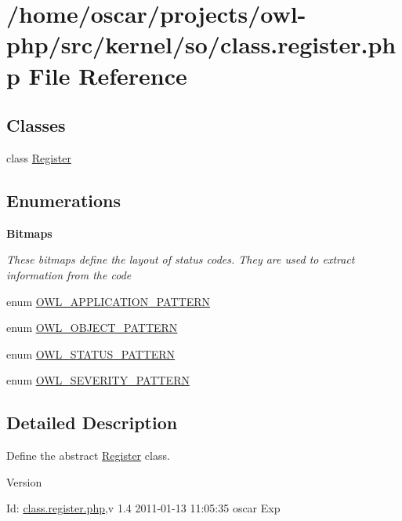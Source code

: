 \section{/home/oscar/projects/owl-\/php/src/kernel/so/class.register.php File Reference}
\label{class_8register_8php}
\subsection*{Classes}
\begin{DoxyCompactItemize}
\item 
class \hyperlink{classRegister}{Register}
\end{DoxyCompactItemize}
\subsection*{Enumerations}
\begin{Indent}{\bf Bitmaps}\par
{\em \label{_amgrp2ec9eef022a1b519bdb1040e05224b00}
 These bitmaps define the layout of status codes. They are used to extract information from the code }\begin{DoxyCompactItemize}
\item 
enum \hyperlink{class_8register_8php_a22359c406b8745e8fa2412ec96d5e74c}{OWL\_\-APPLICATION\_\-PATTERN} 
\item 
enum \hyperlink{class_8register_8php_aac5ed52fb1bbffdff69e9a24c40962f5}{OWL\_\-OBJECT\_\-PATTERN} 
\item 
enum \hyperlink{class_8register_8php_a0a8649e9ad7fa654df2c41aa4ba1283c}{OWL\_\-STATUS\_\-PATTERN} 
\item 
enum \hyperlink{class_8register_8php_aeb9363fcaa1cd911762ff88518a9d973}{OWL\_\-SEVERITY\_\-PATTERN} 
\end{DoxyCompactItemize}
\end{Indent}


\subsection{Detailed Description}
Define the abstract \hyperlink{classRegister}{Register} class. \begin{DoxyVersion}{Version}

\end{DoxyVersion}
\begin{DoxyParagraph}{Id:}
\hyperlink{class_8register_8php}{class.register.php},v 1.4 2011-\/01-\/13 11:05:35 oscar Exp 
\end{DoxyParagraph}


